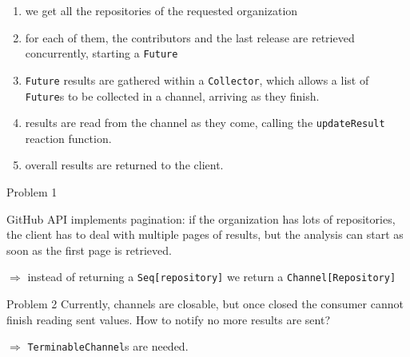 \documentclass[aspectratio=1610,xcolor=dvipsnames]{beamer}
\begin{document}
\begin{frame}
  
  \footnotesize
  \begin{enumerate}
      \item we get all the repositories of the requested organization
      \item for each of them, the contributors and the last release are retrieved concurrently, starting a \texttt{Future}
      \item \texttt{Future} results are gathered within a \texttt{Collector}, which allows a list of \texttt{Future}s to be collected in a channel, arriving as they finish.
      \item results are read from the channel as they come, calling the \texttt{updateResult} reaction function.
      \item overall results are returned to the client.
  \end{enumerate}
\end{frame}


\begin{frame}
  \begin{alertblock}{Problem 1}
      
      \small
      GitHub API implements pagination: if the organization has lots of repositories, the client has to deal with multiple pages of results, but the analysis can start as soon as the first page is retrieved.
  \end{alertblock}
  \pause
  \small$\Rightarrow$ instead of returning a \texttt{Seq[repository]} we return a \texttt{Channel[Repository]}
  \pause
  \begin{alertblock}{Problem 2}
      \small
      Currently, channels are closable, but once closed the consumer cannot finish reading sent values. How to notify no more results are sent?
  \end{alertblock}
  \pause
  \small$\Rightarrow$ \texttt{TerminableChannel}s are needed.
  
\end{frame}


\begin{frame}
  
\end{frame}
\end{document}
